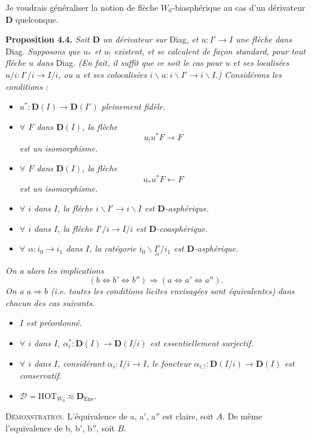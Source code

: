 \documentclass[11pt]{article}
\newcommand{\printedpage}[1]{\marginpar{\footnotesize p.~#1}}
\newcommand{\msp}[1]{\marginpar{\footnotesize [#1]}}
\newcommand{\bD}{\mathbf{D}}
\begin{document}
\printedpage{37}
\msp{page 60}Je voudrais généraliser la notion de flèche $W_0$-biasphérique au cas d'un dérivateur $\bD$ quelconque.

\textbf{Proposition 4.4.} \textit{Soit $\bD$ un dérivateur sur} Diag, \textit{et $u : I' \longrightarrow I$ une flèche dans} Diag. \textit{Supposons que $u_*$ et $u_!$ existent, et se calculent de façon standard, pour tout flèche $u$ dans} Diag. \textit{(En fait, il suffit que ce soit le cas pour $u$ et ses localisées $u/i : I'/i \longrightarrow I/i$, ou $u$ et ses colocalisées $i\backslash u : i\backslash I' \longrightarrow i\backslash I$.) Considérons les conditions :} %
\begin{itemize}[leftmargin=4em]
\item[\textit{a)}] $u^* : \bD(I) \longrightarrow \bD(I')$ \textit{pleinement fidèle.}
\item[\textit{a$'$)}] \textit{$\forall$ $F$ dans $\bD(I)$, la flèche}
\[
u_!u^*F \longrightarrow F
\]
\textit{est un isomorphisme.}
\item[\textit{a$''$)}] \textit{$\forall$ $F$ dans $\bD(I)$, la flèche}
\[
u_*u^*F \longleftarrow F
\]
\textit{est un isomorphisme.}
\item[\textit{b)}] \textit{$\forall$ $i$ dans $I$, la flèche $i\backslash I' \longrightarrow i\backslash I$ est $\bD$-asphérique.}
\item[\textit{b$'$)}] \textit{$\forall$ $i$ dans $I$, la flèche $I'/i \longrightarrow I/i$ est $\bD$-coasphérique.}
\item[\textit{b$''$)}] \textit{$\forall$ $\alpha : i_0 \longrightarrow i_1$ dans $I$, la catégorie $i_0\backslash\underset{\alpha}{I'}/i_1$ est $\bD$-asphérique.}
\end{itemize}
\textit{On a alors les implications}
\[
(b \Longleftrightarrow b' \Longleftrightarrow b'') \Longrightarrow (a \Longleftrightarrow a' \Longleftrightarrow a'').
\]
\textit{On a $a \Longrightarrow b$ (i.e. toutes les conditions licites envisagées sont équivalentes)} \msp{page 61}\textit{dans chacun des cas suivants.}
\begin{itemize}[leftmargin=4em]
\item[$1^o$] \textit{$I$ est préordonné.}
\item[$2^o$] \textit{$\forall$ $i$ dans $I$, $\alpha_i^* : \bD(I) \longrightarrow \bD(I/i)$ est essentiellement surjectif.}
\item[$3^o$] \textit{$\forall$ $i$ dans $I$, considérant $\alpha_i : I/i \longrightarrow I$, le foncteur $\alpha_{i,!} : \bD(I/i) \longrightarrow \bD(I)$ est conservatif.}
\item[$4^o$] $\mathcal{D} = \mathrm{HOT}_{W_0} \approx \bD_{\mathrm{Ens}}$.
\end{itemize}
\textsc{Démonstration}. L'équivalence de a, a$'$, a$''$ est claire, soit $A$. De même l'equivalence de b, b$'$, b$''$, soit $B$. %
\end{document}
